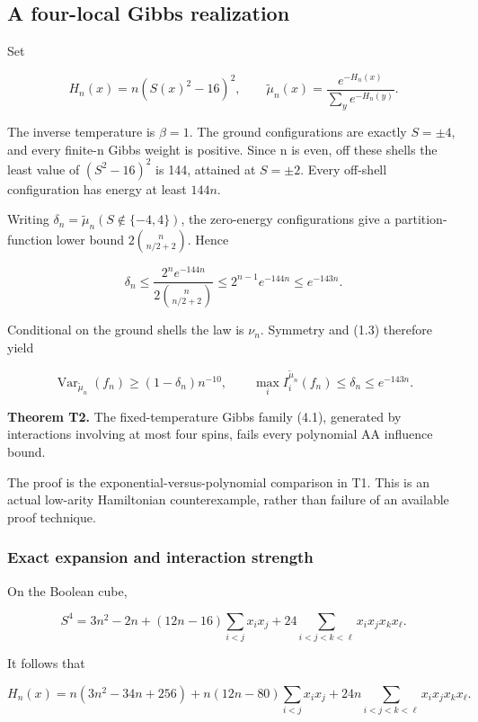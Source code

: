 \subsection{A four-local Gibbs
realization}\label{proof:thin_shell_obstruction:a-four-local-gibbs-realization}

Set

\[
H_n(x)=n(S(x)^2-16)^2,\qquad
\widetilde\mu_n(x)=\frac{e^{-H_n(x)}}{\sum_y e^{-H_n(y)}}.
\tag{4.1}
\]

The inverse temperature is \(\beta =1\). The ground configurations are
exactly \(S=\pm 4\), and every finite-n Gibbs weight is positive. Since
n is even, off these shells the least value of \((S^{2}-16)^{2}\) is
144, attained at \(S=\pm 2\). Every off-shell configuration has energy
at least \(144n\).

Writing \(\delta_n=\widetilde\mu_n(S\notin\{-4,4\})\), the zero-energy
configurations give a partition-function lower bound
\(2\binom{n}{n/2+2}\). Hence

\[
\delta_n\le\frac{2^n e^{-144n}}{2\binom n{n/2+2}}
\le2^{n-1}e^{-144n}\le e^{-143n}.
\tag{4.2}
\]

Conditional on the ground shells the law is \(\nu _n\). Symmetry and
(1.3) therefore yield

\[
\operatorname{Var}_{\widetilde\mu_n}(f_n)\ge(1-\delta_n)n^{-10},
\qquad \max_i I_i^{\widetilde\mu_n}(f_n)\le\delta_n\le e^{-143n}.
\tag{4.3}
\]

\textbf{Theorem T2.} The fixed-temperature Gibbs family (4.1), generated
by interactions involving at most four spins, fails every polynomial AA
influence bound.

The proof is the exponential-versus-polynomial comparison in T1. This is
an actual low-arity Hamiltonian counterexample, rather than failure of
an available proof technique.

\subsubsection{Exact expansion and interaction
strength}\label{proof:thin_shell_obstruction:exact-expansion-and-interaction-strength}

On the Boolean cube,

\[
S^4=3n^2-2n+(12n-16)\sum_{i<j}x_ix_j
+24\sum_{i<j<k<\ell}x_ix_jx_kx_\ell.
\]

It follows that

\[
H_n(x)=n(3n^2-34n+256)
+n(12n-80)\sum_{i<j}x_ix_j
+24n\sum_{i<j<k<\ell}x_ix_jx_kx_\ell.
\tag{4.4}
\]

